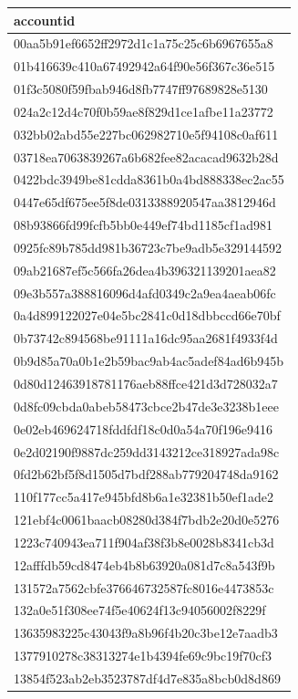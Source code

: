 \begin{tabular}{l}
\toprule
accountid \\
\midrule
00aa5b91ef6652ff2972d1c1a75c25c6b6967655a8 \\
01b416639c410a67492942a64f90e56f367c36e515 \\
01f3c5080f59fbab946d8fb7747ff97689828e5130 \\
024a2c12d4c70f0b59ae8f829d1ce1afbe11a23772 \\
032bb02abd55e227bc062982710e5f94108c0af611 \\
03718ea7063839267a6b682fee82acacad9632b28d \\
0422bdc3949be81cdda8361b0a4bd888338ec2ac55 \\
0447e65df675ee5f8de0313388920547aa3812946d \\
08b93866fd99fcfb5bb0e449ef74bd1185cf1ad981 \\
0925fc89b785dd981b36723c7be9adb5e329144592 \\
09ab21687ef5c566fa26dea4b396321139201aea82 \\
09e3b557a388816096d4afd0349c2a9ea4aeab06fc \\
0a4d899122027e04e5bc2841c0d18dbbccd66e70bf \\
0b73742c894568be91111a16dc95aa2681f4933f4d \\
0b9d85a70a0b1e2b59bac9ab4ac5adef84ad6b945b \\
0d80d12463918781176aeb88ffce421d3d728032a7 \\
0d8fc09cbda0abeb58473cbce2b47de3e3238b1eee \\
0e02eb469624718fddfdf18c0d0a54a70f196e9416 \\
0e2d02190f9887dc259dd3143212ce318927ada98c \\
0fd2b62bf5f8d1505d7bdf288ab779204748da9162 \\
110f177cc5a417e945bfd8b6a1e32381b50ef1ade2 \\
121ebf4c0061baacb08280d384f7bdb2e20d0e5276 \\
1223c740943ea711f904af38f3b8e0028b8341cb3d \\
12afffdb59cd8474eb4b8b63920a081d7c8a543f9b \\
131572a7562cbfe376646732587fc8016e4473853c \\
132a0e51f308ee74f5e40624f13c94056002f8229f \\
13635983225c43043f9a8b96f4b20c3be12e7aadb3 \\
1377910278c38313274e1b4394fe69c9bc19f70cf3 \\
13854f523ab2eb3523787df4d7e835a8bcb0d8d869 \\

\end{tabular}
